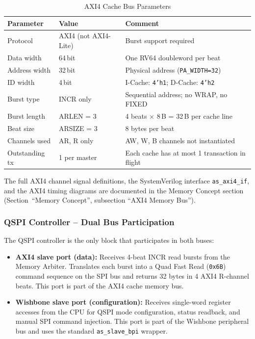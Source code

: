 \begin{table}[H]
\caption{AXI4 Cache Bus Parameters}
\label{tab:asAxi4BusParams}
\centering
\begin{tabularx}{\textwidth}{|l |l |X|}
  \hline
  Parameter & Value & Comment \\
  \hline
  \hline
  Protocol       & AXI4 (not AXI4-Lite)   & Burst support required \\
  \hline
  Data width     & 64\,bit                 & One RV64 doubleword per beat \\
  \hline
  Address width  & 32\,bit                 & Physical address (\texttt{PA\_WIDTH=32}) \\
  \hline
  ID width       & 4\,bit                  & I-Cache: \texttt{4'h1}; D-Cache: \texttt{4'h2} \\
  \hline
  Burst type     & INCR only               & Sequential address; no WRAP, no FIXED \\
  \hline
  Burst length   & ARLEN = 3               & 4 beats $\times$ 8\,B = 32\,B per cache line \\
  \hline
  Beat size      & ARSIZE = 3              & 8 bytes per beat \\
  \hline
  Channels used  & AR, R only              & AW, W, B channels not instantiated \\
  \hline
  Outstanding tx & 1 per master            & Each cache has at most 1 transaction in flight \\
  \hline
\end{tabularx}
\end{table}

The full AXI4 channel signal definitions, the SystemVerilog interface
\texttt{as\_axi4\_if}, and the AXI4 timing diagrams are documented in
the Memory Concept section (Section~``Memory Concept'',
subsection ``AXI4 Memory Bus'').

\subsubsection{QSPI Controller -- Dual Bus Participation}

The QSPI controller is the only block that participates in both buses:

\begin{itemize}
  \item \textbf{AXI4 slave port (data):}
    Receives 4-beat INCR read bursts from the Memory Arbiter.
    Translates each burst into a Quad Fast Read (\texttt{0x6B})
    command sequence on the SPI bus and returns 32 bytes in 4 AXI4
    R-channel beats.
    This port is part of the AXI4 cache memory bus.

  \item \textbf{Wishbone slave port (configuration):}
    Receives single-word register accesses from the CPU for
    QSPI mode configuration, status readback, and manual SPI command
    injection.
    This port is part of the Wishbone peripheral bus and uses the
    standard \texttt{as\_slave\_bpi} wrapper.
\end{itemize}

